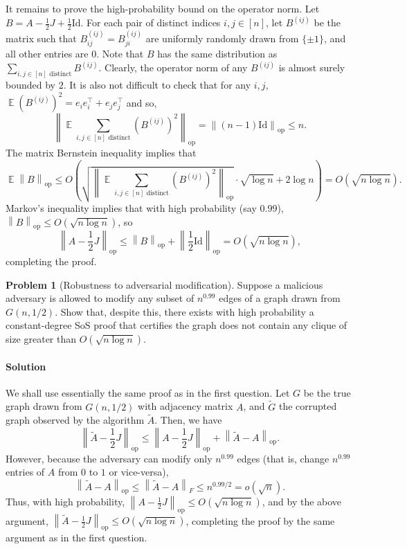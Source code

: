 \documentclass[11pt]{article}
\theoremstyle{definition}
\newtheorem{problem}[theorem]{Problem}
\newcommand{\norm}[1]{\left\| #1 \right\|}
\newcommand{\wt}[1]{\widetilde{#1}}
\DeclareMathOperator{\E}{\mathbb{E}} %
\newcommand{\Id}{\mathrm{Id}}
\newcommand{\opnorm}[1]{\left\|#1\right\|_{\mathrm{op}}}
\begin{document}
  It remains to prove the high-probability bound on the operator norm. Let $B = A - \frac{1}{2} J + \frac{1}{2} \Id$. For each pair of distinct indices $i,j \in [n]$, let $B^{(ij)}$ be the matrix such that $B^{(ij)}_{ij} = B^{(ij)}_{ji}$ are uniformly randomly drawn from $\{\pm 1\}$, and all other entries are $0$. Note that $B$ has the same distribution as $\sum_{i,j \in [n] \text{ distinct}} B^{(ij)}$. Clearly, the operator norm of any $B^{(ij)}$ is almost surely bounded by $2$. It is also not difficult to check that for any $i,j$, $\E (B^{(ij)})^2 = e_i e_i^\top + e_j e_j^\top$ and so,
  \[ \opnorm{\E \sum_{i,j \in [n] \text{ distinct}} (B^{(ij)})^2} = \opnorm{ (n-1) \Id } \le n. \]
  The matrix Bernstein inequality implies that
  \[ \E \opnorm{B} \le O\left( \sqrt{ \opnorm{ \E \sum_{i,j \in [n] \text{ distinct}} (B^{(ij)})^2 } } \cdot \sqrt{\log n} + 2 \log n \right) = O(\sqrt{n \log n}). \]
  Markov's inequality implies that with high probability (say $0.99$), $\opnorm{B} \le O(\sqrt{n \log n})$, so
  \[ \opnorm{ A - \frac{1}{2} J } \le \opnorm{B} + \opnorm{ \frac{1}{2} \Id } = O(\sqrt{n \log n}), \]
  completing the proof.

\clearpage

\begin{problem}[Robustness to adversarial modification]
  Suppose a malicious adversary is allowed to modify any subset of $n^{0.99}$ edges of a graph drawn from $G(n,1/2)$. Show that, despite this, there exists with high probability a constant-degree SoS proof that certifies the graph does not contain any clique of size greater than $O(\sqrt{n \log n})$.
\end{problem}

\paragraph{Solution}

  We shall use essentially the same proof as in the first question. Let $G$ be the true graph drawn from $G(n,1/2)$ with adjacency matrix $A$, and $\wt{G}$ the corrupted graph observed by the algorithm $\wt{A}$. Then, we have
  \[ \opnorm{\wt{A} - \frac{1}{2} J} \le \opnorm{ A - \frac{1}{2} J} + \opnorm{\wt{A} - A}. \]
  However, because the adversary can modify only $n^{0.99}$ edges (that is, change $n^{0.99}$ entries of $A$ from $0$ to $1$ or vice-versa),
  \[ \opnorm{\wt{A} - A} \le \norm{\wt{A} - A}_F \le n^{0.99/2} = o(\sqrt{n}). \]
  Thus, with high probability, $\opnorm{ A - \frac{1}{2} J } \le O(\sqrt{n \log n})$, and by the above argument, $\opnorm{\wt{A} - \frac{1}{2} J} \le O(\sqrt{n \log n})$, completing the proof by the same argument as in the first question.
\end{document}
